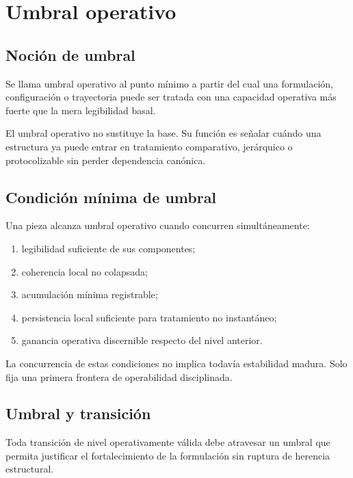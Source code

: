 \chapter{Umbral operativo}

\section{Noción de umbral}
\begin{definition}
Se llama umbral operativo al punto mínimo a partir del cual una formulación, configuración o trayectoria puede ser tratada con una capacidad operativa más fuerte que la mera legibilidad basal.
\end{definition}

\begin{observation}
El umbral operativo no sustituye la base. Su función es señalar cuándo una estructura ya puede entrar en tratamiento comparativo, jerárquico o protocolizable sin perder dependencia canónica.
\end{observation}

\section{Condición mínima de umbral}
\begin{definition}
Una pieza alcanza umbral operativo cuando concurren simultáneamente:
\begin{enumerate}
  \item legibilidad suficiente de sus componentes;
  \item coherencia local no colapsada;
  \item acumulación mínima registrable;
  \item persistencia local suficiente para tratamiento no instantáneo;
  \item ganancia operativa discernible respecto del nivel anterior.
\end{enumerate}
\end{definition}

\begin{observation}
La concurrencia de estas condiciones no implica todavía estabilidad madura. Solo fija una primera frontera de operabilidad disciplinada.
\end{observation}

\section{Umbral y transición}
\begin{definition}
Toda transición de nivel operativamente válida debe atravesar un umbral que permita justificar el fortalecimiento de la formulación sin ruptura de herencia estructural.
\end{definition}


